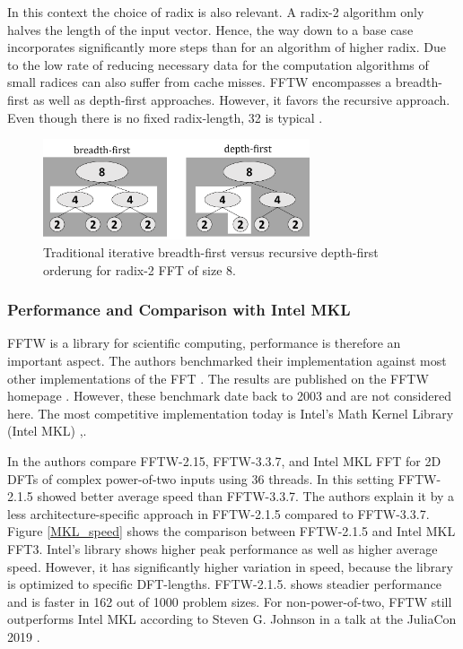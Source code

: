 \documentclass{usiinftr}
\begin{document}
In this context the choice of radix is also relevant.
A radix-2 algorithm only halves the length of the input vector.
Hence, the way down to a base case incorporates significantly more steps than for an algorithm of higher radix.
Due to the low rate of reducing necessary data for the computation algorithms of small radices can also suffer from cache misses.
FFTW encompasses a breadth-first as well as depth-first approaches. However, it favors the recursive approach. Even though there is no fixed radix-length, 32 is typical \cite{JohnsonFr08:burrus}.

\begin{figure}[h] 
\centering
\includegraphics[width=0.7\textwidth]{figures/beadth_first.png}
\caption{Traditional iterative breadth-first versus recursive depth-first orderung for radix-2 FFT of size 8\cite{JohnsonFr08:burrus}. }
\label{breadth_first}
\end{figure}

\subsubsection{Performance and Comparison with Intel MKL}
FFTW is a library for scientific computing, performance is therefore an important aspect.
The authors benchmarked their implementation against most other implementations of the FFT \cite{JuliaCon}.
The results are published on the FFTW homepage \cite{FFTWspeed}.
However, these benchmark date back to 2003 and are not considered here.
The most competitive implementation today is Intel's Math Kernel Library (Intel MKL) \cite{khokhriakov2018novel},\cite{JuliaCon}.

In \cite{khokhriakov2018novel} the authors compare FFTW-2.15, FFTW-3.3.7, and Intel MKL FFT for 2D DFTs of complex power-of-two inputs using 36 threads.
In this setting FFTW-2.1.5 showed better average speed than FFTW-3.3.7.
The authors explain it by a less architecture-specific approach in FFTW-2.1.5 compared to FFTW-3.3.7. Figure \ref{MKL_speed} shows the comparison between FFTW-2.1.5 and Intel MKL FFT3.
Intel's library shows higher peak performance as well as higher average speed.
However, it has significantly higher variation in speed, because the library is optimized to specific DFT-lengths.
FFTW-2.1.5. shows steadier performance and is faster in 162 out of 1000 problem sizes\cite{khokhriakov2018novel}.
For non-power-of-two, FFTW still outperforms Intel MKL according to Steven G. Johnson in a talk at the JuliaCon 2019 \cite{JuliaCon}.
\end{document}
